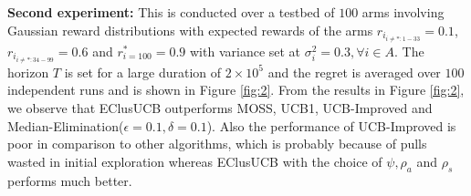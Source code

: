 \textbf{Second experiment:} This is conducted over a testbed of $100$ arms involving Gaussian reward distributions with expected rewards of the arms $r_{i_{{i}\neq {*}:1-33}}=0.1$, $r_{i_{{i}\neq {*}:34-99}}=0.6$ and $r^{*}_{i=100}=0.9$ with variance set at $\sigma_{i}^{2} = 0.3,\forall i\in A$. The horizon $T$ is set for a large duration of $2\times 10^{5}$ and the regret is averaged over $100$ independent runs and is shown in Figure \ref{fig:2}. From the results in Figure \ref{fig:2}, we observe that EClusUCB outperforms MOSS, UCB1, UCB-Improved and Median-Elimination($\epsilon=0.1,\delta=0.1$). Also the performance of UCB-Improved is poor in comparison to other algorithms, which is probably because of pulls wasted in initial exploration whereas EClusUCB with the choice of $\psi, \rho_{a}$ and $\rho_{s}$ performs much better.

